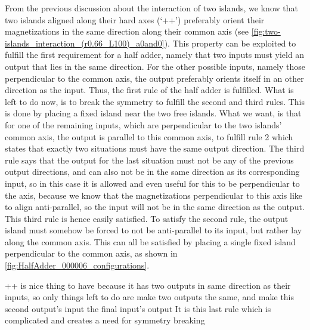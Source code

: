 \documentclass[11pt,a4paper,english]{article}
\begin{document}
From the previous discussion about the interaction of two islands, we know that two islands aligned along their hard axes (`++') preferably orient their magnetizations in the same direction along their common axis (see \cref{fig:two-islands_interaction_(r0.66_L100)_a0and0}). This property can be exploited to fulfill the first requirement for a half adder, namely that two inputs must yield an output that lies in the same direction. %
For the other possible inputs, namely those perpendicular to the common axis, the output preferably orients itself in an other direction as the input. Thus, the first rule of the half adder is fulfilled.
What is left to do now, is to break the symmetry to fulfill the second and third rules. This is done by placing a fixed island near the two free islands. What we want, is that for one of the remaining inputs, which are perpendicular to the two islands' common axis, the output is parallel to this common axis, to fulfill rule 2 which states that exactly two situations must have the same output direction. The third rule says that the output for the last situation must not be any of the previous output directions, and can also not be in the same direction as its corresponding input, so in this case it is allowed and even useful for this to be perpendicular to the axis, because we know that the magnetizations perpendicular to this axis like to align anti-parallel, so the input will not be in the same direction as the output. This third rule is hence easily satisfied. To satisfy the second rule, the output island must somehow be forced to not be anti-parallel to its input, but rather lay along the common axis. This can all be satisfied by placing a single fixed island perpendicular to the common axis, as shown in \cref{fig:HalfAdder_000006_configurations}.


++ is nice thing to have because it has two outputs in same direction as their inputs, so only things left to do are make two outputs the same, and make this second output's input the final input's output
It is this last rule which is complicated and creates a need for symmetry breaking
\end{document}
